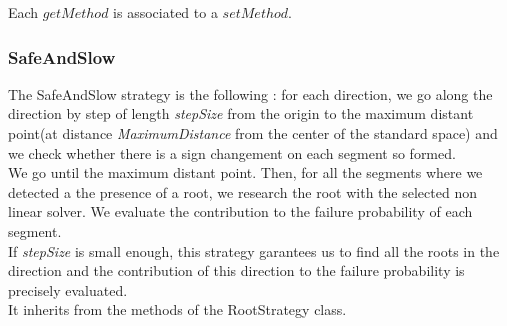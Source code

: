 \begin{description}
  Each $getMethod$  is associated to a $setMethod$.

\end{description}
\newpage \subsubsection{SafeAndSlow}

The SafeAndSlow strategy is the following : for each direction, we go along the direction by step of length {\itshape stepSize} from the origin to the maximum distant point(at distance {\itshape MaximumDistance} from the center of the standard space) and we check whether there is a sign changement on each segment so formed.\\
We go until the maximum distant point.  Then, for all the segments where we detected a the presence of a root, we research the root with the selected non linear solver. We evaluate the contribution to the failure probability of each segment. \\
If {\itshape stepSize} is small enough, this strategy garantees us to find all the roots in the direction and the contribution of this direction to the failure probability is precisely evaluated.\\

It inherits from the methods of the RootStrategy class.


